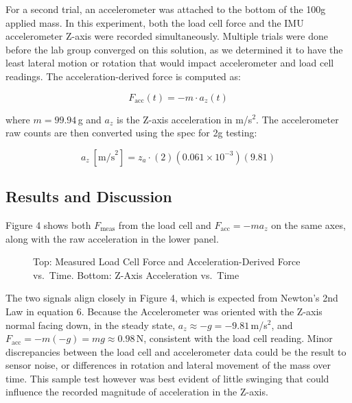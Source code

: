 \documentclass{article}
\begin{document}
For a second trial, an accelerometer was attached to the bottom of the 100g applied mass. In this experiment, both the load cell force and the IMU accelerometer Z-axis were recorded simultaneously. Multiple trials were done before the lab group converged on this solution, as we determined it to have the least lateral motion or rotation that would impact accelerometer and load cell readings. The acceleration-derived force is computed as:

\begin{equation}
    F_\text{acc}(t) = -m \cdot a_z(t)
    \label{eq:facc}
\end{equation}

\noindent where $m = 99.94$\,g and $a_z$ is the Z-axis acceleration in m/s$^2$. The accelerometer raw counts are then converted using the spec for 2g testing:

\begin{equation}
    a_z\ [\text{m/s}^2] = z_a  \cdot (2)(0.061 \times 10^{-3})(9.81)
\end{equation}

\subsection{Results and Discussion}

Figure 4 shows both $F_\text{meas}$ from the load cell and $F_\text{acc} = -ma_z$ on the same axes, along with the raw acceleration in the lower panel.

\begin{figure}[H]
    \centering
    \caption{Top: Measured Load Cell Force and Acceleration-Derived Force vs.\ Time. Bottom: Z-Axis Acceleration vs.\ Time}
    \label{fig:force_accel}
\end{figure}

\noindent The two signals align closely in Figure 4, which is expected from Newton's 2nd Law in equation 6. Because the Accelerometer was oriented with the Z-axis normal facing down, in the steady state, $a_z \approx -g = -9.81$\,m/s$^2$, and $F_\text{acc} = -m(-g) = mg \approx 0.98$\,N, consistent with the load cell reading. Minor discrepancies between the load cell and accelerometer data could be the result to sensor noise, or differences in rotation and lateral movement of the mass over time. This sample test however was best evident of little swinging that could influence the recorded magnitude of acceleration in the Z-axis.
\end{document}
